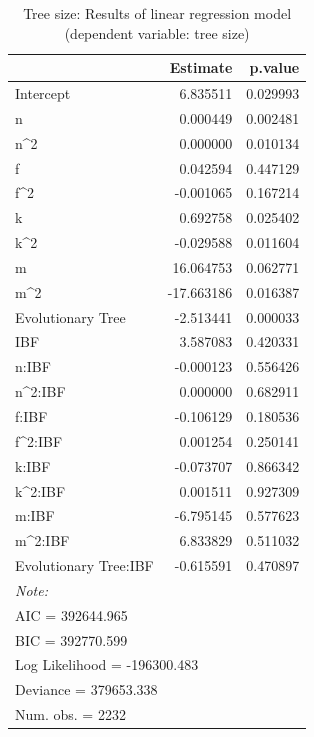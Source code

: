 \documentclass[]{elsarticle} %
\begin{document}
\begin{table}

\caption{\label{tab:model-tree-results}\label{tab:model-tree-results}Tree size: Results of linear regression model (dependent variable: tree size)}
\centering
\begin{tabular}[t]{lrr}
\toprule
  & Estimate & p.value\\
\midrule
Intercept & 6.835511 & 0.029993\\
n & 0.000449 & 0.002481\\
n\textasciicircum{}2 & 0.000000 & 0.010134\\
f & 0.042594 & 0.447129\\
f\textasciicircum{}2 & -0.001065 & 0.167214\\
\addlinespace
k & 0.692758 & 0.025402\\
k\textasciicircum{}2 & -0.029588 & 0.011604\\
m & 16.064753 & 0.062771\\
m\textasciicircum{}2 & -17.663186 & 0.016387\\
Evolutionary Tree & -2.513441 & 0.000033\\
\addlinespace
IBF & 3.587083 & 0.420331\\
\hline
n:IBF & -0.000123 & 0.556426\\
n\textasciicircum{}2:IBF & 0.000000 & 0.682911\\
f:IBF & -0.106129 & 0.180536\\
f\textasciicircum{}2:IBF & 0.001254 & 0.250141\\
\addlinespace
k:IBF & -0.073707 & 0.866342\\
k\textasciicircum{}2:IBF & 0.001511 & 0.927309\\
m:IBF & -6.795145 & 0.577623\\
m\textasciicircum{}2:IBF & 6.833829 & 0.511032\\
Evolutionary Tree:IBF & -0.615591 & 0.470897\\
\bottomrule
\multicolumn{3}{l}{\textit{Note: }}\\
\multicolumn{3}{l}{AIC  =  392644.965}\\
\multicolumn{3}{l}{BIC  =  392770.599}\\
\multicolumn{3}{l}{Log Likelihood  =  -196300.483}\\
\multicolumn{3}{l}{Deviance  =  379653.338}\\
\multicolumn{3}{l}{Num. obs.  =  2232}\\
\end{tabular}
\end{table}
\end{document}
